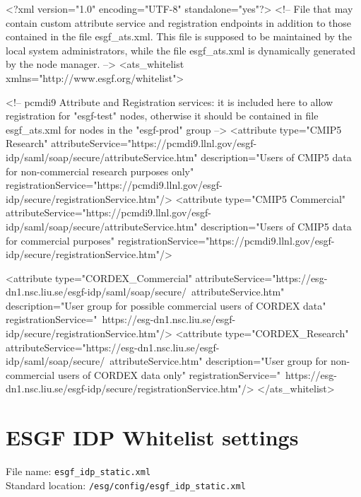 \begin{tiny}
\begin{verbatimtab}[4]
<?xml version="1.0" encoding="UTF-8" standalone="yes"?>
<!-- File that may contain custom attribute service and registration endpoints 
     in addition to those contained in the file esgf_ats.xml. 
     This file is supposed to be maintained by the local system administrators,
     while the file esgf_ats.xml is dynamically generated by the node manager. -->
<ats_whitelist xmlns="http://www.esgf.org/whitelist">

	<!-- pcmdi9 Attribute and Registration services: it is included here to allow registration for "esgf-test" nodes,
	     otherwise it should be contained in file esgf_ats.xml for nodes in the "esgf-prod" group -->
	<attribute type="CMIP5 Research"
               attributeService="https://pcmdi9.llnl.gov/esgf-idp/saml/soap/secure/attributeService.htm"
               description="Users of CMIP5 data for non-commercial research purposes only"
               registrationService="https://pcmdi9.llnl.gov/esgf-idp/secure/registrationService.htm"/>
    <attribute type="CMIP5 Commercial"
               attributeService="https://pcmdi9.llnl.gov/esgf-idp/saml/soap/secure/attributeService.htm"
               description="Users of CMIP5 data for commercial purposes"
               registrationService="https://pcmdi9.llnl.gov/esgf-idp/secure/registrationService.htm"/>

    <attribute type="CORDEX_Commercial" attributeService="https://esg-dn1.nsc.liu.se/esgf-idp/saml/soap/secure/\
	attributeService.htm" description="User group for possible commercial users of CORDEX data" registrationService="\
	https://esg-dn1.nsc.liu.se/esgf-idp/secure/registrationService.htm"/>
    <attribute type="CORDEX_Research" attributeService="https://esg-dn1.nsc.liu.se/esgf-idp/saml/soap/secure/\
	attributeService.htm" description="User group for non-commercial users of CORDEX data only" registrationService="\
	https://esg-dn1.nsc.liu.se/esgf-idp/secure/registrationService.htm"/>
</ats_whitelist>
\end{verbatimtab}
\end{tiny}

\section{ESGF IDP Whitelist settings}
File name: \texttt{esgf\_idp\_static.xml}\\
Standard location: \texttt{/esg/config/esgf\_idp\_static.xml}

